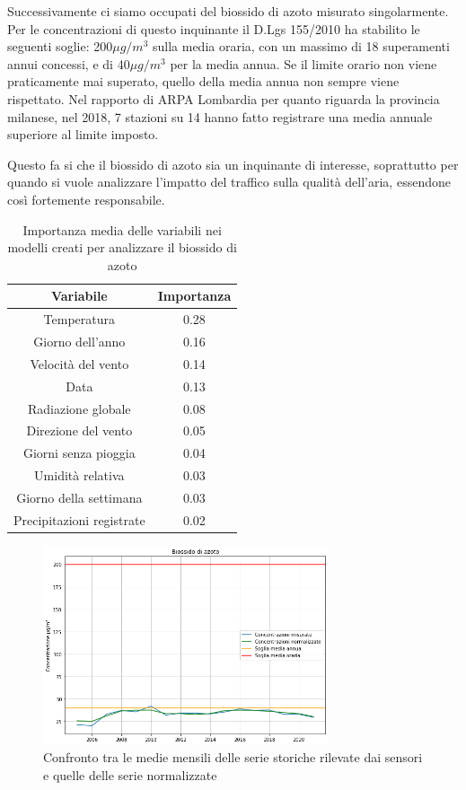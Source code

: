 \documentclass[a4paper]{report}
\begin{document}
Successivamente ci siamo occupati del biossido di azoto misurato singolarmente. Per le concentrazioni di questo inquinante il D.Lgs 155/2010 ha stabilito le seguenti soglie: 200$\mu g/m^3$ sulla media oraria, con un massimo di 18 superamenti annui concessi, e di 40$\mu g/m^3$ per la media annua. Se il limite orario non viene praticamente mai superato, quello della media annua non sempre viene rispettato. Nel rapporto di ARPA Lombardia \cite{arpa2018rapporto} per quanto riguarda la provincia milanese, nel 2018, 7 stazioni su 14 hanno fatto registrare una media annuale superiore al limite imposto.

Questo fa si che il biossido di azoto sia un inquinante di interesse, soprattutto per quando si vuole analizzare l'impatto del traffico sulla qualità dell'aria, essendone così fortemente responsabile.

\begin{table}[h!]
\centering
\begin{tabular}{ |c c| }
	\hline
	Variabile & Importanza \\
	\hline
	Temperatura & 0.28 \\
	Giorno dell'anno & 0.16 \\
	Velocità del vento & 0.14 \\
	Data & 0.13 \\
	Radiazione globale & 0.08 \\
	Direzione del vento & 0.05 \\
	Giorni senza pioggia & 0.04 \\
	Umidità relativa & 0.03 \\
	Giorno della settimana & 0.03 \\
	Precipitazioni registrate & 0.02 \\
	\hline
\end{tabular}
\caption{Importanza media delle variabili nei modelli creati per analizzare il biossido di azoto}
\label{table:importanza_no2}
\end{table}

\begin{figure}[h]
\centering
\includegraphics[width=0.75\textwidth]{no2_medie_annuali}
\caption{Confronto tra le medie mensili delle serie storiche rilevate dai sensori e quelle delle serie normalizzate}
\label{fig:no2_medie_annuali}
\end{figure}
\end{document}
